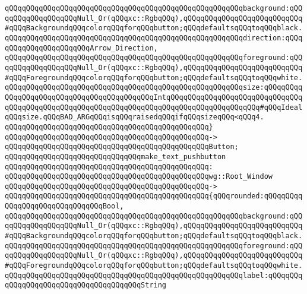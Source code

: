 \verb|qQQqqQQqqQQqqQQqqQQqqQQqqQQqqQQqqQQqqQQqqQQqqQQqqQQqqQQqbackground:qQQqqQQqqQQqqQQqqQQqNull_Or(qQQqxc::RgbqQQq),qQQqqQQqqQQqqQQqqQQqqQQqqQQq#qQQqBackgroundqQQqcolorqQQqforqQQqbutton;qQQqdefaultsqQQqtoqQQqblack.|\newline
\verb|qQQqqQQqqQQqqQQqqQQqqQQqqQQqqQQqqQQqqQQqqQQqqQQqqQQqqQQqdirection:qQQqqQQqqQQqqQQqqQQqqQQqArrow_Direction,|\newline
\verb|qQQqqQQqqQQqqQQqqQQqqQQqqQQqqQQqqQQqqQQqqQQqqQQqqQQqqQQqforeground:qQQqqQQqqQQqqQQqqQQqNull_Or(qQQqxc::RgbqQQq),qQQqqQQqqQQqqQQqqQQqqQQqqQQq#qQQqForegroundqQQqcolorqQQqforqQQqbutton;qQQqdefaultsqQQqtoqQQqwhite.|\newline
\verb|qQQqqQQqqQQqqQQqqQQqqQQqqQQqqQQqqQQqqQQqqQQqqQQqqQQqqQQqsize:qQQqqQQqqQQqqQQqqQQqqQQqqQQqqQQqqQQqqQQqqQQqIntqQQqqQQqqQQqqQQqqQQqqQQqqQQqqQQqqQQqqQQqqQQqqQQqqQQqqQQqqQQqqQQqqQQqqQQqqQQqqQQqqQQqqQQqqQQq#qQQqIdealqQQqsize.qQQqBAD_ARGqQQqisqQQqraisedqQQqifqQQqsizeqQQq<qQQq4.|\newline
\verb|qQQqqQQqqQQqqQQqqQQqqQQqqQQqqQQqqQQqqQQqqQQqqQQq}|\newline
\verb|qQQqqQQqqQQqqQQqqQQqqQQqqQQqqQQqqQQqqQQqqQQqqQQq->|\newline
\verb|qQQqqQQqqQQqqQQqqQQqqQQqqQQqqQQqqQQqqQQqqQQqqQQqButton;|\newline
\newline
\verb|qQQqqQQqqQQqqQQqqQQqqQQqqQQqqQQqmake_text_pushbutton|\newline
\verb|qQQqqQQqqQQqqQQqqQQqqQQqqQQqqQQqqQQqqQQqqQQqqQQq:|\newline
\verb|qQQqqQQqqQQqqQQqqQQqqQQqqQQqqQQqqQQqqQQqqQQqqQQqwg::Root_Window|\newline
\verb|qQQqqQQqqQQqqQQqqQQqqQQqqQQqqQQqqQQqqQQqqQQqqQQq->|\newline
\verb|qQQqqQQqqQQqqQQqqQQqqQQqqQQqqQQqqQQqqQQqqQQqqQQq{qQQqrounded:qQQqqQQqqQQqqQQqqQQqqQQqqQQqqQQqBool,|\newline
\verb|qQQqqQQqqQQqqQQqqQQqqQQqqQQqqQQqqQQqqQQqqQQqqQQqqQQqqQQqbackground:qQQqqQQqqQQqqQQqqQQqNull_Or(qQQqxc::RgbqQQq),qQQqqQQqqQQqqQQqqQQqqQQqqQQq#qQQqBackgroundqQQqcolorqQQqforqQQqbutton;qQQqdefaultsqQQqtoqQQqblack.|\newline
\verb|qQQqqQQqqQQqqQQqqQQqqQQqqQQqqQQqqQQqqQQqqQQqqQQqqQQqqQQqforeground:qQQqqQQqqQQqqQQqqQQqNull_Or(qQQqxc::RgbqQQq),qQQqqQQqqQQqqQQqqQQqqQQqqQQq#qQQqForegroundqQQqcolorqQQqforqQQqbutton;qQQqdefaultsqQQqtoqQQqwhite.|\newline
\verb|qQQqqQQqqQQqqQQqqQQqqQQqqQQqqQQqqQQqqQQqqQQqqQQqqQQqqQQqlabel:qQQqqQQqqQQqqQQqqQQqqQQqqQQqqQQqqQQqqQQqString|\newline
